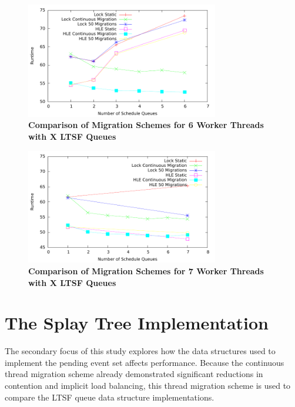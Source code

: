 \documentclass[11pt]{book}
\begin{document}
\begin{figure}
    \centering
    \graphicspath{ {./figures/} }
    \includegraphics[width=0.75\textwidth,keepaspectratio]{migComp_6threads}
    \caption{\textbf{Comparison of Migration Schemes for 6 Worker Threads with X LTSF
        Queues}}\label{fig:migComp_6threads}
\end{figure}

\begin{figure}
    \centering
    \graphicspath{ {./figures/} }
    \includegraphics[width=0.75\textwidth,keepaspectratio]{migComp_7threads}
    \caption{\textbf{Comparison of Migration Schemes for 7 Worker Threads with X LTSF
        Queues}}\label{fig:migComp_7threads}
\end{figure}

\section{The Splay Tree Implementation}

The secondary focus of this study explores how the data structures used to
implement the pending event set affects performance.  Because the continuous
thread migration scheme already demonstrated significant reductions in
contention and implicit load balancing, this thread migration scheme is used to
compare the LTSF queue data structure implementations.  
\end{document}
